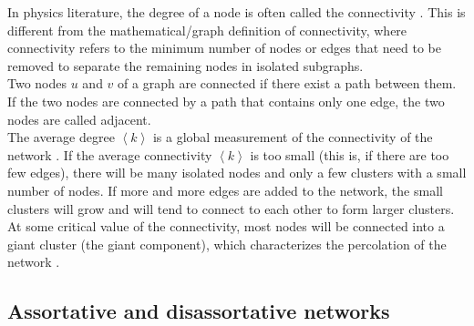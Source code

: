 \documentclass[11 pt , letterpaper , twoside , openright]{book}
\begin{document}
In physics literature, the degree of a node is often called the connectivity \cite{F.Costa2007}\cite{Mendes2002}. This is different from the mathematical/graph definition of connectivity, where connectivity refers to the minimum number of nodes or edges that need to be removed to separate the remaining nodes in isolated subgraphs.\\
\newline
Two nodes $u$ and $v$ of a graph are connected if there exist a path between them. If the two nodes are connected by a path that contains only one edge, the two nodes are called adjacent.\\
\newline
The average degree $\left<k\right>$ is a global measurement of the connectivity of the network \cite{Costa2008}. If the average connectivity $\left<k\right>$ is too small (this is, if there are too few edges), there will be many isolated nodes and only a few clusters with a small number of nodes. If more and more edges are added to the network, the small clusters will grow and will tend to connect to each other to form larger clusters. At some critical value of the connectivity, most nodes will be connected into a giant cluster (the giant component), which characterizes the percolation of the network \cite{F.Costa2007}.

\subsection{Assortative and disassortative networks}
\end{document}
